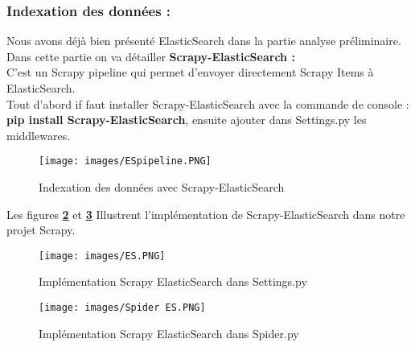 \subsubsection{Indexation des données :} Nous avons déjà bien présenté ElasticSearch dans la partie analyse préliminaire.
Dans cette partie on va détailler \textbf{Scrapy-ElasticSearch :}\\ C’est un Scrapy pipeline qui permet d'envoyer directement Scrapy Items à ElasticSearch.\\
Tout d’abord if faut installer Scrapy-ElasticSearch avec la commande de console :\\ \textbf{pip install Scrapy-ElasticSearch}, ensuite ajouter dans Settings.py les middlewares.
\begin{figure}[H]
            \centering
            \texttt{[image: images/ESpipeline.PNG]}
            \caption{Indexation des données avec Scrapy-ElasticSearch \cite{itempipeline}}
            \label{fig:Proxy}  
        \end{figure}
Les figures \textbf{\ref{fig:ES}} et \textbf{\ref{fig:Spider ES}} Illustrent l’implémentation de Scrapy-ElasticSearch dans notre projet Scrapy.
\begin{figure}[H]
            \centering
            \texttt{[image: images/ES.PNG]}
            \caption{Implémentation Scrapy ElasticSearch dans Settings.py}
            \label{fig:ES}  
        \end{figure}
        
\begin{figure}[H]
            \centering
            \texttt{[image: images/Spider ES.PNG]}
            \caption{Implémentation Scrapy ElasticSearch dans Spider.py}
            \label{fig:Spider ES}  
        \end{figure}

